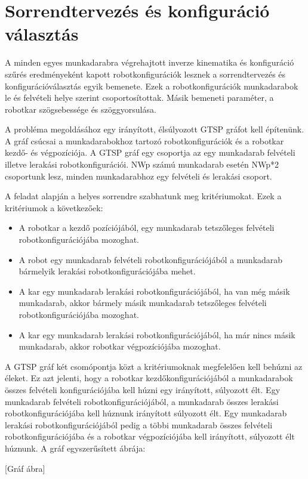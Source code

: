 \section{Sorrendtervezés és konfiguráció választás}
A minden egyes munkadarabra végrehajtott inverze kinematika és konfiguráció szűrés eredményeként kapott robotkonfigurációk lesznek a sorrendtervezés és konfigurációválasztás egyik bemenete. Ezek a robotkonfigurációk munkadarabok le és felvételi helye szerint csoportosítottak. Másik bemeneti paraméter, a robotkar szögsebessége és szöggyorsulása.

A probléma megoldásához egy irányított, élsúlyozott GTSP gráfot kell építenünk. A gráf csúcsai a munkadarabokhoz tartozó robotkonfigurációk és a robotkar kezdő- és végpozíciója. A GTSP gráf egy csoportja az egy munkadarab felvételi illetve lerakási robotkonfigurációi. NWp számú munkadarab esetén NWp*2 csoportunk lesz, minden munkadarabhoz egy felvételi és lerakási csoport.

A feladat alapján a helyes sorrendre szabhatunk meg kritériumokat. Ezek a kritériumok a következőek:
\begin{itemize}
\item A robotkar a kezdő pozíciójából, egy munkadarab tetszőleges felvételi robotkonfigurációjába mozoghat.
\item A robot egy munkadarab felvételi robotkonfigurációjából a munkadarab bármelyik lerakási robotkonfigurációjába mehet.
\item A kar egy munkadarab lerakási robotkonfigurációjából, ha van még másik munkadarab, akkor bármely másik munkadarab tetszőleges felvételi robotkonfigurációjába mozoghat.
\item A kar egy munkadarab lerakási robotkonfigurációjából, ha már nincs másik munkadarab, akkor robotkar végpozíciójába mozoghat. 
\end{itemize}

A GTSP gráf két csomópontja közt a kritériumoknak megfelelően kell behúzni az éleket. Ez azt jelenti, hogy a robotkar kezdőkonfigurációjából a munkadarabok összes felvételi konfigurációjába kell húzni egy irányított, súlyozott élt. Egy munkadarab felvételi robotkonfigurációjából, a munkadarab összes lerakási robotkonfigurációjába kell húznunk irányított súlyozott élt. Egy munkadarab lerakási robotkonfigurációjából pedig a többi munkadarab összes felvételi robotkonfigurációjába és a robotkar végpozíciójába kell irányított, súlyozott élt húznunk. A gráf egyszerűsített ábrája:

[Gráf ábra]


